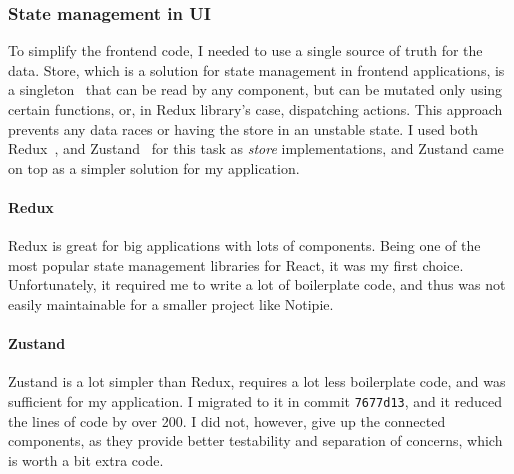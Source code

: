 \subsubsection{State management in UI}\label{sec:state-management-in-ui}

To simplify the frontend code,
I needed to use a single source of truth for the data.
Store,
which is a solution for state management
in frontend applications,
is a singleton~\cite{gamma_design_1994}
that can be read by any component,
but can be mutated only using certain functions,
or, in Redux library's case, dispatching actions.
This approach prevents any data races
or having the store in an unstable state.
I used both Redux~\cite{gaeraon_redux_2022},
and Zustand~\cite{kato_zustand_2022} for this task
as \textit{store} implementations,
and Zustand came on top as a simpler solution for my application.

\paragraph{Redux}\label{sec:redux}

Redux is great for big applications with lots of components.
Being one of the most popular state management libraries for React,
it was my first choice.
Unfortunately,
it required me to write a lot of boilerplate code,
and thus was not easily maintainable
for a smaller project like Notipie.

\paragraph{Zustand}\label{sec:zustand}

Zustand is a lot simpler than Redux,
requires a lot less boilerplate code,
and was sufficient for my application.
I migrated to it in commit
\texttt{7677d13},
and it reduced the lines of code by over 200.
I did not, however, give up the connected components,
as they provide better testability and separation of concerns,
which is worth a bit extra code.

